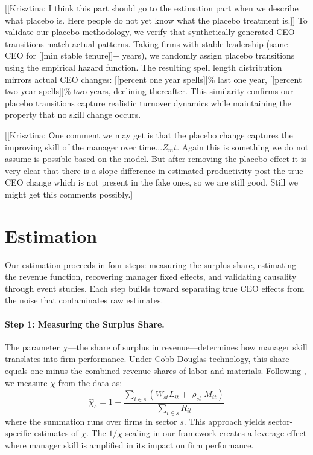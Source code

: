 \documentclass[11pt,a4paper]{article}
\begin{document}
[[Krisztina: I think this part should go to the estimation part when we describe what placebo is. Here people do not yet know what the placebo treatment is.]]
To validate our placebo methodology, we verify that synthetically generated CEO transitions match actual patterns. Taking firms with stable leadership (same CEO for [[min stable tenure]]+ years), we randomly assign placebo transitions using the empirical hazard function. The resulting spell length distribution mirrors actual CEO changes: [[percent one year spells]]\% last one year, [[percent two year spells]]\% two years, declining thereafter. This similarity confirms our placebo transitions capture realistic turnover dynamics while maintaining the property that no skill change occurs.

[[Krisztina: One comment we may get is that the placebo change captures the improving skill of the manager over time...$Z_mt$. Again this is something we do not assume is possible based on the  model. But after removing the placebo effect it is very clear that there is a slope difference in estimated productivity post the true CEO change which is not present in the fake ones, so we are still good. Still we might get this comments possibly.]



\section{Estimation}

Our estimation proceeds in four steps: measuring the surplus share, estimating the revenue function, recovering manager fixed effects, and validating causality through event studies. Each step builds toward separating true CEO effects from the noise that contaminates raw estimates.

\paragraph{Step 1: Measuring the Surplus Share.} The parameter $\chi$---the share of surplus in revenue---determines how manager skill translates into firm performance. Under Cobb-Douglas technology, this share equals one minus the combined revenue shares of labor and materials. Following \citet{Gandhi2020-nu}, we measure $\chi$ from the data as:
\begin{equation}
\hat{\chi}_s = 1 - \frac{\sum_{i \in s}(W_{st}L_{it} + \varrho_{st}M_{it})}{\sum_{i \in s} R_{it}}
\end{equation}
where the summation runs over firms in sector $s$. This approach yields sector-specific estimates of $\chi$. The $1/\chi$ scaling in our framework creates a leverage effect where manager skill is amplified in its impact on firm performance.
\end{document}
